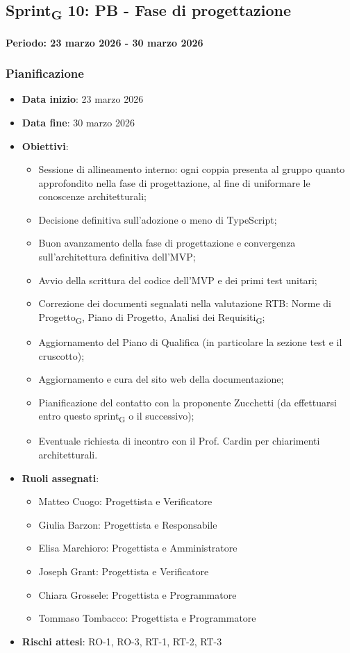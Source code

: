 \documentclass[11pt,a4paper]{article}
\newcommand{\gls}[1]{#1\textsubscript{G}}
\begin{document}
\subsection{\gls{Sprint} 10: PB - Fase di progettazione}
{\textbf{Periodo: 23 marzo 2026 - 30 marzo 2026}\par}

\subsubsection{Pianificazione}
\begin{itemize}
    \item \textbf{Data inizio}: 23 marzo 2026
    \item \textbf{Data fine}: 30 marzo 2026
        \item \textbf{Obiettivi}:
    \begin{itemize}
        \item Sessione di allineamento interno: ogni coppia presenta al gruppo quanto approfondito nella fase di progettazione, al fine di uniformare le conoscenze architetturali;
        \item Decisione definitiva sull'adozione o meno di TypeScript;
        \item Buon avanzamento della fase di progettazione e convergenza sull'architettura definitiva dell'MVP;
        \item Avvio della scrittura del codice dell'MVP e dei primi test unitari;
        \item Correzione dei documenti segnalati nella valutazione RTB: \gls{Norme di Progetto}, Piano di Progetto, \gls{Analisi dei Requisiti};
        \item Aggiornamento del Piano di Qualifica (in particolare la sezione test e il cruscotto);
        \item Aggiornamento e cura del sito web della documentazione;
        \item Pianificazione del contatto con la proponente Zucchetti (da effettuarsi entro questo \gls{sprint} o il successivo);
        \item Eventuale richiesta di incontro con il Prof. Cardin per chiarimenti architetturali.
    \end{itemize}
    
    \item \textbf{Ruoli assegnati}:
    \begin{itemize}
        \item Matteo Cuogo: Progettista e Verificatore
        \item Giulia Barzon: Progettista e Responsabile
        \item Elisa Marchioro: Progettista e Amministratore
        \item Joseph Grant: Progettista e Verificatore
        \item Chiara Grossele: Progettista e Programmatore
        \item Tommaso Tombacco: Progettista e Programmatore
    \end{itemize}
    \item \textbf{Rischi attesi}: RO-1, RO-3, RT-1, RT-2, RT-3
\end{itemize}
\end{document}

